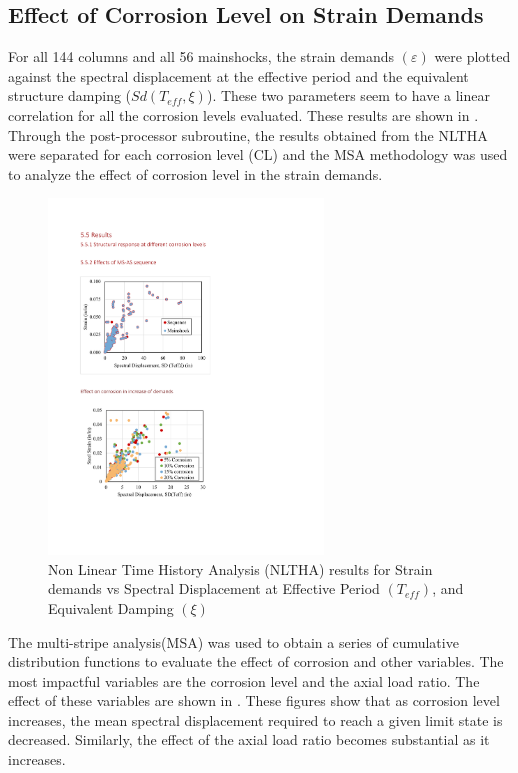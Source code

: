 \subsection{Effect of Corrosion Level on Strain Demands}

For all 144 columns and all 56 mainshocks, the strain demands $(\varepsilon)$ were plotted against the spectral displacement at the effective period and the equivalent structure damping ($Sd(T_{eff},\xi)$). These two parameters seem to have a linear correlation for all the corrosion levels evaluated. These results are shown in . Through the post-processor subroutine, the results obtained from the NLTHA were separated for each corrosion level (CL) and the MSA methodology was used to analyze the effect of corrosion level in the strain demands.

\begin{figure}[htbp]
	\centering
	\includegraphics[width=0.65\textwidth]{VAC Thesis 2.0/Chapter-5/figs/All_results_NLTHA_Figure.pdf}
	\caption{Non Linear Time History Analysis (NLTHA) results for Strain demands vs Spectral Displacement at Effective Period $(T_{eff})$, and Equivalent Damping $(\xi)$}
	\label{fig:all_results_nltha}
\end{figure}

The multi-stripe analysis(MSA) was used to obtain a series of cumulative distribution functions to evaluate the effect of corrosion and other variables. The most impactful variables are the corrosion level and the axial load ratio. The effect of these variables are shown in . These figures show that as corrosion level increases, the mean spectral displacement required to reach a given limit state is decreased. Similarly, the effect of the axial load ratio becomes substantial as it increases.

